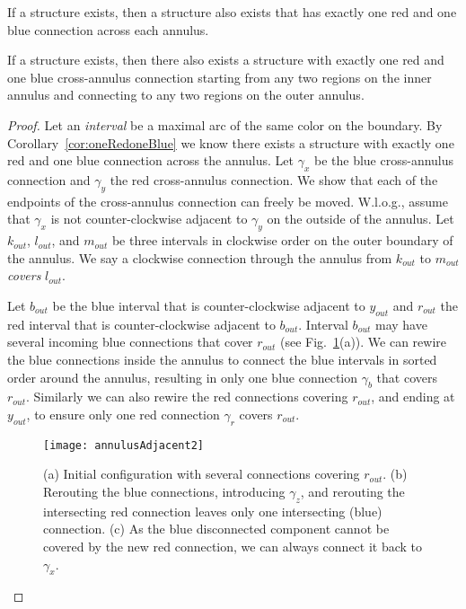 \documentclass[runningheads]{llncs}
\begin{document}
\begin{corollary}
If a structure exists, then a structure also exists that has exactly one red and one blue connection across each annulus.
\label{cor:oneRedoneBlue}
\end{corollary}

\begin{lemma}\label{lem:move}
If a structure exists, then there also exists a structure with exactly one red and one blue cross-annulus connection starting from any two regions on the inner annulus and connecting to any two regions on the outer annulus.
\end{lemma}
\begin{proof}
Let an \emph{interval} be a maximal arc of the same color on the boundary.
By Corollary~\ref{cor:oneRedoneBlue} we know there exists a structure with exactly one red and one blue connection across the annulus.
Let $\gamma_x$ be the blue cross-annulus connection and $\gamma_y$ the red cross-annulus connection.
We show that each of the endpoints of the cross-annulus connection can freely be moved.
W.l.o.g., assume that $\gamma_x$ is not counter-clockwise adjacent to $\gamma_y$ on the outside of the annulus.
Let $k_{out}$, $l_{out}$, and $m_{out}$ be three intervals in clockwise order on the outer boundary of the annulus.
We say a clockwise connection through the annulus from $k_{out}$ to $m_{out}$ \emph{covers} $l_{out}$.

Let $b_{out}$ be the blue interval that is counter-clockwise adjacent to $y_{out}$ and $r_{out}$ the red interval that is counter-clockwise adjacent to $b_{out}$.
Interval $b_{out}$ may have several incoming blue connections that cover $r_{out}$ (see Fig.~\ref{fig:annulusAdjacent2}(a)).
We can rewire the blue connections inside the annulus to connect the blue intervals in sorted order around the annulus, resulting in only one blue connection $\gamma_b$ that covers $r_{out}$.
Similarly we can also rewire the red connections covering $r_{out}$, and ending at $y_{out}$, to ensure only one red connection $\gamma_r$ covers $r_{out}$.

	\begin{figure}[t]
	\centering
	\texttt{[image: annulusAdjacent2]}
		\caption{(a) Initial configuration with several connections covering $r_{out}$. (b) Rerouting the blue connections, introducing $\gamma_z$, and rerouting the intersecting red connection leaves only one intersecting (blue) connection. (c) As the blue disconnected component cannot be covered by the new red connection, we can always connect it back to $\gamma_x$.}
		\label{fig:annulusAdjacent2}
	\end{figure}


\end{proof}
\end{document}
